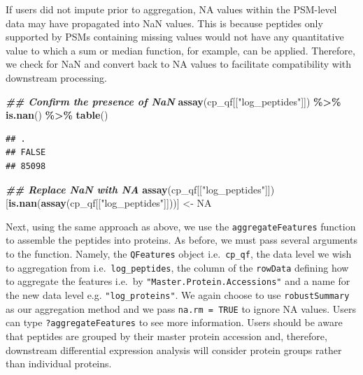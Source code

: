 \documentclass[9pt,a4paper,]{extarticle}
\newenvironment{Shaded}{\begin{snugshade}}{\end{snugshade}}
\newcommand{\ConstantTok}[1]{\textcolor[rgb]{0.56,0.35,0.01}{#1}}
\newcommand{\DocumentationTok}[1]{\textcolor[rgb]{0.56,0.35,0.01}{\textbf{\textit{#1}}}}
\newcommand{\FunctionTok}[1]{\textcolor[rgb]{0.13,0.29,0.53}{\textbf{#1}}}
\newcommand{\NormalTok}[1]{#1}
\newcommand{\OtherTok}[1]{\textcolor[rgb]{0.56,0.35,0.01}{#1}}
\newcommand{\SpecialCharTok}[1]{\textcolor[rgb]{0.81,0.36,0.00}{\textbf{#1}}}
\newcommand{\StringTok}[1]{\textcolor[rgb]{0.31,0.60,0.02}{#1}}
\begin{document}
If users did not impute prior to aggregation, NA values within the PSM-level
data may have propagated into NaN values. This is because peptides only
supported by PSMs containing missing values would not have any quantitative
value to which a sum or median function, for example, can be applied. Therefore,
we check for NaN and convert back to NA values to facilitate compatibility with
downstream processing.

\begin{Shaded}
\begin{Highlighting}[]
\DocumentationTok{\#\# Confirm the presence of NaN}
\FunctionTok{assay}\NormalTok{(cp\_qf[[}\StringTok{"log\_peptides"}\NormalTok{]]) }\SpecialCharTok{\%\textgreater{}\%}
  \FunctionTok{is.nan}\NormalTok{() }\SpecialCharTok{\%\textgreater{}\%}
  \FunctionTok{table}\NormalTok{()}
\end{Highlighting}
\end{Shaded}

\begin{verbatim}
## .
## FALSE 
## 85098
\end{verbatim}

\begin{Shaded}
\begin{Highlighting}[]
\DocumentationTok{\#\# Replace NaN with NA}
\FunctionTok{assay}\NormalTok{(cp\_qf[[}\StringTok{"log\_peptides"}\NormalTok{]])[}\FunctionTok{is.nan}\NormalTok{(}\FunctionTok{assay}\NormalTok{(cp\_qf[[}\StringTok{"log\_peptides"}\NormalTok{]]))] }\OtherTok{\textless{}{-}} \ConstantTok{NA}
\end{Highlighting}
\end{Shaded}

Next, using the same approach as above, we use the \texttt{aggregateFeatures} function
to assemble the peptides into proteins. As before, we must pass several
arguments to the function. Namely, the \texttt{QFeatures} object i.e.~\texttt{cp\_qf}, the data
level we wish to aggregation from i.e.~\texttt{log\_peptides}, the column of the
\texttt{rowData} defining how to aggregate the features i.e.~by
\texttt{"Master.Protein.Accessions"} and a name for the new data level e.g.
\texttt{"log\_proteins"}. We again choose to use \texttt{robustSummary} as our aggregation
method and we pass \texttt{na.rm\ =\ TRUE} to ignore NA values. Users can type
\texttt{?aggregateFeatures} to see more information. Users should be aware that
peptides are grouped by their master protein accession and, therefore,
downstream differential expression analysis will consider protein groups rather
than individual proteins.
\end{document}
